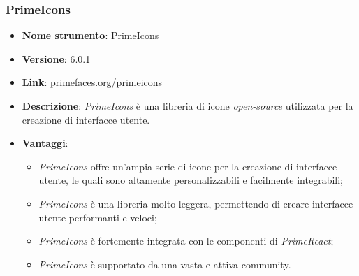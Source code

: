 \subsubsection{PrimeIcons}
\begin{itemize}
    \item \textbf{Nome strumento}: PrimeIcons
    \item \textbf{Versione}: 6.0.1
    \item \textbf{Link}: \href{https://primefaces.org/primeicons}{primefaces.org/primeicons}
    \item \textbf{Descrizione}: \textit{PrimeIcons} è una libreria di icone \textit{open-source} utilizzata per la creazione di interfacce utente.
    \item \textbf{Vantaggi}:
          \begin{itemize}
              \item \textit{PrimeIcons} offre un'ampia serie di icone per la creazione di interfacce utente, le quali sono altamente personalizzabili e facilmente integrabili;
              \item \textit{PrimeIcons} è una libreria molto leggera, permettendo di creare interfacce utente performanti e veloci;
              \item \textit{PrimeIcons} è fortemente integrata con le componenti di \textit{PrimeReact};
              \item \textit{PrimeIcons} è supportato da una vasta e attiva community.
          \end{itemize}
\end{itemize}

